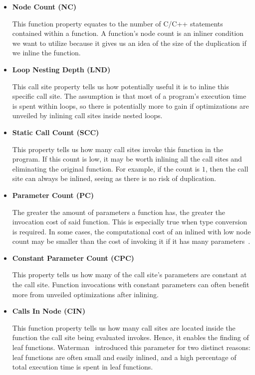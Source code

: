 \begin{itemize}

	\item \textbf{Node Count (NC)}

This function property equates to the number of C/C++ statements contained
within a function. A function's node count is an inliner condition we want
to utilize because it gives us an idea of the size of the  duplication if we
inline the function.

	\item \textbf{Loop Nesting Depth (LND)}

This call site property tells us how potentially useful it is to inline this
specific call site. The assumption is that most of a program's execution time is
spent within loops, so there is potentially more to gain if optimizations are
unveiled by inlining call sites inside nested loops.

	\item \textbf{Static Call Count (SCC)}

This property tells us how many call sites invoke this function in the program.
If this count is low, it may be worth inlining all the call sites and
eliminating the original function. For example, if the count is $1$, then the
call site can always be inlined, seeing as there is no risk of  duplication.

	\item \textbf{Parameter Count (PC)}

The greater the amount of parameters a function has, the greater the invocation
cost of said function. This is especially true when type conversion is required.
In some cases, the computational cost of an inlined with low node count may
be smaller than the cost of invoking it if it has many
parameters~\cite{AdaptvCompilAndInlingWaterman}.

	\item \textbf{Constant Parameter Count (CPC)}

This property tells us how many of the call site's parameters are constant at
the call site. Function invocations with constant parameters can often benefit
more from unveiled optimizations after inlining.

	\item \textbf{Calls In Node (CIN)}

This function property tells us how many call sites are located inside the
function the call site being evaluated invokes. Hence, it enables the finding of
leaf functions. Waterman~\cite{AdaptvCompilAndInlingWaterman} introduced this
parameter for two distinct reasons: leaf functions are often small and easily
inlined, and a high percentage of total execution time is spent in leaf
functions.

\end{itemize}

